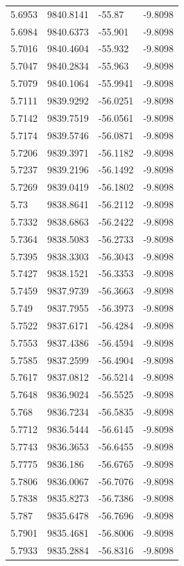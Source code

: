 \begin{table}[H]
\begin{tabular}{llll}
5.6953 & 9840.8141 & -55.87 & -9.8098 \\
5.6984 & 9840.6373 & -55.901 & -9.8098 \\
5.7016 & 9840.4604 & -55.932 & -9.8098 \\
5.7047 & 9840.2834 & -55.963 & -9.8098 \\
5.7079 & 9840.1064 & -55.9941 & -9.8098 \\
5.7111 & 9839.9292 & -56.0251 & -9.8098 \\
5.7142 & 9839.7519 & -56.0561 & -9.8098 \\
5.7174 & 9839.5746 & -56.0871 & -9.8098 \\
5.7206 & 9839.3971 & -56.1182 & -9.8098 \\
5.7237 & 9839.2196 & -56.1492 & -9.8098 \\
5.7269 & 9839.0419 & -56.1802 & -9.8098 \\
5.73 & 9838.8641 & -56.2112 & -9.8098 \\
5.7332 & 9838.6863 & -56.2422 & -9.8098 \\
5.7364 & 9838.5083 & -56.2733 & -9.8098 \\
5.7395 & 9838.3303 & -56.3043 & -9.8098 \\
5.7427 & 9838.1521 & -56.3353 & -9.8098 \\
5.7459 & 9837.9739 & -56.3663 & -9.8098 \\
5.749 & 9837.7955 & -56.3973 & -9.8098 \\
5.7522 & 9837.6171 & -56.4284 & -9.8098 \\
5.7553 & 9837.4386 & -56.4594 & -9.8098 \\
5.7585 & 9837.2599 & -56.4904 & -9.8098 \\
5.7617 & 9837.0812 & -56.5214 & -9.8098 \\
5.7648 & 9836.9024 & -56.5525 & -9.8098 \\
5.768 & 9836.7234 & -56.5835 & -9.8098 \\
5.7712 & 9836.5444 & -56.6145 & -9.8098 \\
5.7743 & 9836.3653 & -56.6455 & -9.8098 \\
5.7775 & 9836.186 & -56.6765 & -9.8098 \\
5.7806 & 9836.0067 & -56.7076 & -9.8098 \\
5.7838 & 9835.8273 & -56.7386 & -9.8098 \\
5.787 & 9835.6478 & -56.7696 & -9.8098 \\
5.7901 & 9835.4681 & -56.8006 & -9.8098 \\
5.7933 & 9835.2884 & -56.8316 & -9.8098 \\

\end{tabular}
\end{table}
